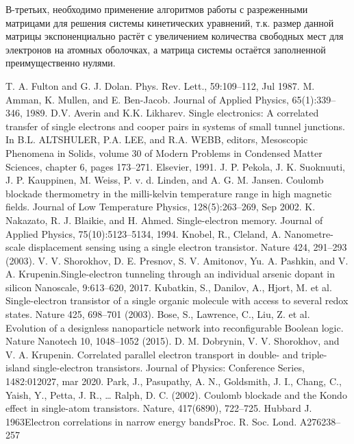 \documentclass[12pt,a4paper]{report}
\begin{document}
В-третьих, необходимо применение алгоритмов работы с разреженными матрицами для решения системы кинетических уравнений, т.к. размер данной матрицы экспоненциально растёт с увеличением количества свободных мест для электронов на атомных оболочках, а матрица системы остаётся заполненной преимущественно нулями.
\renewcommand\bibname{Cписок литературы}
\begin{thebibliography}{99}
	 T. A. Fulton and G. J. Dolan. Phys. Rev. Lett., 59:109–112, Jul 1987.
	M. Amman, K. Mullen, and E. Ben-Jacob. Journal of Applied Physics, 65(1):339–346,
1989.
	D.V. Averin and K.K. Likharev. Single electronics: A correlated transfer of single
electrons and cooper pairs in systems of small tunnel junctions. In B.L. ALTSHULER,
P.A. LEE, and R.A. WEBB, editors, Mesoscopic Phenomena in Solids, volume 30 of
Modern Problems in Condensed Matter Sciences, chapter 6, pages 173–271. Elsevier,
1991.
	 J. P. Pekola, J. K. Suoknuuti, J. P. Kauppinen, M. Weiss, P. v. d. Linden, and A. G. M.
Jansen. Coulomb blockade thermometry in the milli-kelvin temperature range in high
magnetic fields. Journal of Low Temperature Physics, 128(5):263–269, Sep 2002.
	 K. Nakazato, R. J. Blaikie, and H. Ahmed. Single-electron memory. Journal of Applied
Physics, 75(10):5123–5134, 1994.
	 Knobel, R., Cleland, A. Nanometre-scale displacement sensing using a single electron transistor. Nature 424, 291–293 (2003).
	 V. V. Shorokhov, D. E. Presnov, S. V. Amitonov, Yu. A. Pashkin, and V. A. Krupenin.Single-electron tunneling through an individual arsenic dopant in silicon
Nanoscale, 9:613–620, 2017.
	 Kubatkin, S., Danilov, A., Hjort, M. et al. Single-electron transistor of a single organic molecule with access to several redox states. Nature 425, 698–701 (2003).
	 Bose, S., Lawrence, C., Liu, Z. et al. Evolution of a designless nanoparticle network into reconfigurable Boolean logic. Nature Nanotech 10, 1048–1052 (2015).
	 D. M. Dobrynin, V. V. Shorokhov, and V. A. Krupenin. Correlated parallel electron
transport in double- and triple-island single-electron transistors. Journal of Physics:
Conference Series, 1482:012027, mar 2020.
	 Park, J., Pasupathy, A. N., Goldsmith, J. I., Chang, C., Yaish, Y., Petta, J. R., … Ralph, D. C. (2002). Coulomb blockade and the Kondo effect in single-atom transistors. Nature, 417(6890), 722–725.
	 Hubbard J. 1963Electron correlations in narrow energy bandsProc. R. Soc. Lond. A276238–257

\end{thebibliography}
\end{document}
